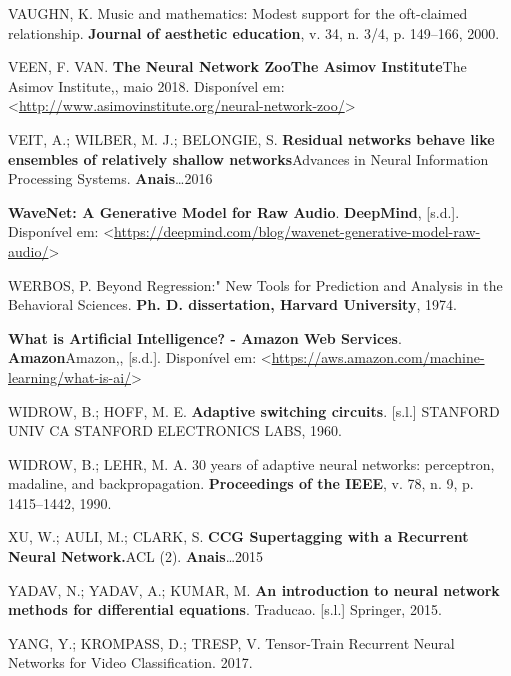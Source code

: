 \documentclass[]{article}
\begin{document}
\leavevmode\hypertarget{ref-vaughn2000music}{}%
VAUGHN, K. Music and mathematics: Modest support for the oft-claimed
relationship. \textbf{Journal of aesthetic education}, v. 34, n. 3/4, p.
149--166, 2000.

\leavevmode\hypertarget{ref-veen_2018}{}%
VEEN, F. VAN. \textbf{The Neural Network Zoo}\textbf{The Asimov
Institute}The Asimov Institute,, maio 2018. Disponível em:
\textless{}\url{http://www.asimovinstitute.org/neural-network-zoo/}\textgreater{}

\leavevmode\hypertarget{ref-veit2016residual}{}%
VEIT, A.; WILBER, M. J.; BELONGIE, S. \textbf{Residual networks behave
like ensembles of relatively shallow networks}Advances in Neural
Information Processing Systems. \textbf{Anais}\ldots{}2016

\leavevmode\hypertarget{ref-deepmind}{}%
\textbf{WaveNet: A Generative Model for Raw Audio}. \textbf{DeepMind},
{[}s.d.{]}. Disponível em:
\textless{}\url{https://deepmind.com/blog/wavenet-generative-model-raw-audio/}\textgreater{}

\leavevmode\hypertarget{ref-werbos1974beyond}{}%
WERBOS, P. Beyond Regression:" New Tools for Prediction and Analysis in
the Behavioral Sciences. \textbf{Ph. D. dissertation, Harvard
University}, 1974.

\leavevmode\hypertarget{ref-amazon}{}%
\textbf{What is Artificial Intelligence? - Amazon Web Services}.
\textbf{Amazon}Amazon,, {[}s.d.{]}. Disponível em:
\textless{}\url{https://aws.amazon.com/machine-learning/what-is-ai/}\textgreater{}

\leavevmode\hypertarget{ref-widrow1960adaptive}{}%
WIDROW, B.; HOFF, M. E. \textbf{Adaptive switching circuits}. {[}s.l.{]}
STANFORD UNIV CA STANFORD ELECTRONICS LABS, 1960.

\leavevmode\hypertarget{ref-widrow199030}{}%
WIDROW, B.; LEHR, M. A. 30 years of adaptive neural networks:
perceptron, madaline, and backpropagation. \textbf{Proceedings of the
IEEE}, v. 78, n. 9, p. 1415--1442, 1990.

\leavevmode\hypertarget{ref-xu2015ccg}{}%
XU, W.; AULI, M.; CLARK, S. \textbf{CCG Supertagging with a Recurrent
Neural Network.}ACL (2). \textbf{Anais}\ldots{}2015

\leavevmode\hypertarget{ref-yadav2015introduction}{}%
YADAV, N.; YADAV, A.; KUMAR, M. \textbf{An introduction to neural
network methods for differential equations}. Traducao. {[}s.l.{]}
Springer, 2015.

\leavevmode\hypertarget{ref-Yang2017}{}%
YANG, Y.; KROMPASS, D.; TRESP, V. Tensor-Train Recurrent Neural Networks
for Video Classification. 2017.
\end{document}
